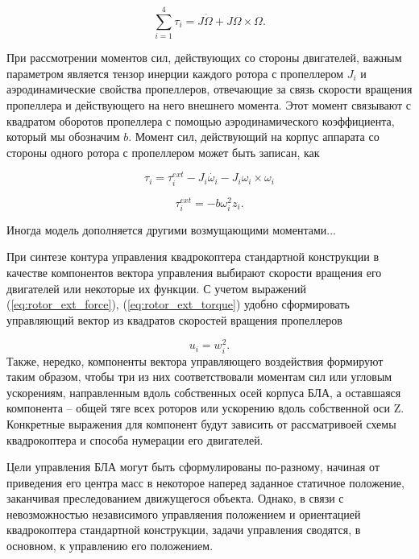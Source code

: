 \documentclass[a4paper,14pt,oneside,openany]{memoir}
\begin{document}
   	\begin{equation} \label{eq:common_rotational_motion}
   	\sum_{i=1}^{4}{\tau_i} = J\dot{\Omega} + J{\Omega} \times \Omega.
   	\end{equation}
    
     При рассмотрении моментов сил, действующих со стороны двигателей, важным параметром является тензор инерции каждого ротора с пропеллером $J_i$ и аэродинамические свойства пропеллеров, отвечающие за связь скорости вращения пропеллера и действующего на него внешнего момента. Этот момент связывают с квадратом оборотов пропеллера с помощью аэродинамического коэффициента, который мы обозначим $b$. Момент сил, действующий на корпус аппарата со стороны одного ротора с пропеллером может быть записан, как
     
     
   	\begin{equation} \label{eq:rotor_torque}
   	\tau_i = \tau_i^{ext} - J_i \dot{\omega_i} - J_i{\omega_i} \times \omega_i
   	\end{equation}
   	
 	\begin{equation} \label{eq:rotor_ext_torque}
	\tau_i^{ext} = -b \omega^2_i z_i.
 	\end{equation}
   	
     Иногда модель дополняется другими возмущающими моментами...
     
     При синтезе контура управления квадрокоптера стандартной конструкции в качестве компонентов вектора управления выбирают скорости вращения его двигателей или некоторые их функции. С учетом выражений (\ref{eq:rotor_ext_force}), (\ref{eq:rotor_ext_torque}) удобно сформировать управляющий вектор из квадратов скоростей вращения пропеллеров
 
   	\begin{equation} \label{eq:common_control_vector}
	 u_i = w_i^2.
   	\end{equation}
     Также, нередко, компоненты вектора управляющего воздействия формируют таким образом, чтобы три из них соответствовали моментам сил или угловым ускорениям, направленным вдоль собственных осей корпуса БЛА, а оставшаяся компонента -- общей тяге всех роторов или ускорению вдоль собственной оси {Z}. Конкретные выражения для компонент будут зависить от рассматривоей схемы квадрокоптера и способа нумерации его двигателей.
     
     Цели управления БЛА могут быть сформулированы по-разному, начиная от приведения его центра масс в некоторое наперед заданное статичное положение, заканчивая преследованием движущегося объекта. Однако, в связи с невозможностью независимого управляения положением и ориентацией квадрокоптера стандартной конструкции, задачи управления сводятся, в основном, к управлению его положением.
     
\end{document}

